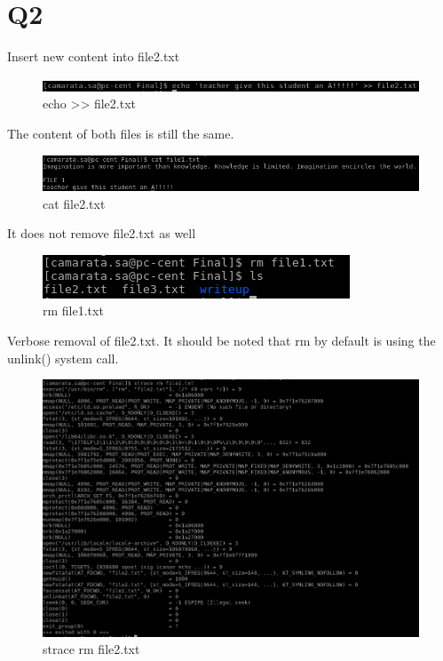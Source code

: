 \documentclass[10pt]{article}
\begin{document}
\section{Q2}
Insert new content into file2.txt

\begin{figure}[H]
\centering
\includegraphics[scale=0.5]{./images/ss5.png}
\caption{echo >> file2.txt}
\label{echo >> file2.txt}
\end{figure}

The content of both files is still the same.

\begin{figure}[H]
\centering
\includegraphics[scale=0.5]{./images/ss6.png}
\caption{cat file2.txt}
\label{cat file2.txt}
\end{figure}

It does not remove file2.txt as well

\begin{figure}[H]
\centering
\includegraphics[scale=0.5]{./images/ss7.png}
\caption{rm file1.txt}
\label{rm file1.txt}
\end{figure}

Verbose removal of file2.txt.  It should be noted that rm by default is using the unlink() system call.

\begin{figure}[H]
\centering
\includegraphics[scale=0.5]{./images/ss8.png}
\caption{strace rm file2.txt}
\label{strace rm file2.txt}
\end{figure}
\end{document}
